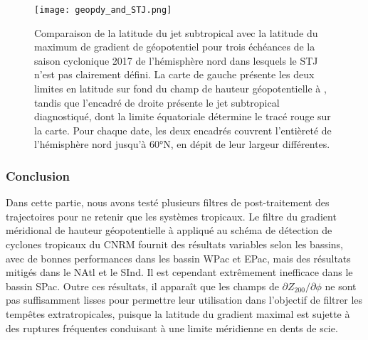 \documentclass[../main.tex]{subfiles}
\begin{document}
\begin{figure}[tb]
    \centering
    \texttt{[image: geopdy\_and\_STJ.png]}
    \caption{Comparaison de la latitude du jet subtropical avec la latitude du maximum de gradient de géopotentiel pour trois échéances de la saison cyclonique
    2017 de l'hémisphère nord dans lesquels le STJ n'est pas clairement défini. La carte de gauche présente les deux limites en latitude sur fond du champ de
    hauteur géopotentielle à , tandis que l'encadré de droite présente le jet subtropical diagnostiqué, dont la limite équatoriale détermine le tracé rouge
    sur la carte. Pour chaque date, les deux encadrés couvrent l'entièreté de l'hémisphère nord jusqu'à \ang{60}N, en dépit de leur largeur différentes.}
    \label{fig:geopdy_and_STJ}
\end{figure}

\subsubsection*{Conclusion}

Dans cette partie, nous avons testé plusieurs filtres de post-traitement des trajectoires pour ne retenir que les systèmes tropicaux. Le filtre du gradient
méridional de hauteur géopotentielle à  appliqué au schéma de détection de cyclones tropicaux du CNRM fournit des résultats variables selon les
bassins, avec de bonnes performances dans les bassin WPac et EPac, mais des résultats mitigés dans le NAtl et le SInd. Il est cependant extrêmement inefficace
dans le bassin SPac. Outre ces résultats, il apparaît que les champs de $\partial Z_{200} / \partial \phi$ ne sont pas suffisamment lisses pour permettre leur
utilisation dans l'objectif de filtrer les tempêtes extratropicales, puisque la latitude du gradient maximal est sujette à des ruptures fréquentes conduisant à
une limite méridienne en dents de scie.
\end{document}
